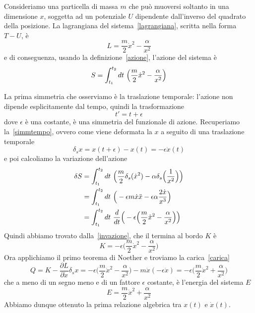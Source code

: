     \begin{example}
        Consideriamo una particella di massa $m$ che può muoversi soltanto in una dimensione $x$, soggetta ad un potenziale $U$ dipendente dall'inverso del quadrato della posizione. La lagrangiana del sistema~\eqref{lagrangiana}, scritta nella forma $T - U$, è
    \begin{equation} \label{lag1}
        L = \frac{m}{2} \dot x^2 - \frac{\alpha}{x^2} 
    \end{equation}
        e di conseguenza, usando la definizione~\eqref{azione}, l'azione del sistema è
    \begin{equation}
        S = \int_{t_1}^{t_2}dt~ \Big( \frac{m}{2} \dot x^2 - \frac{\alpha}{x^2} \Big)
    \end{equation}

        La prima simmetria che osserviamo è la traslazione temporale: l'azione non dipende esplicitamente dal tempo, quindi la trasformazione
    \begin{equation*}
        t' = t + \epsilon
    \end{equation*}
        dove $\epsilon$ è una costante, è una simmetria del funzionale di azione. Recuperiamo la~\eqref{simmtempo}, ovvero come viene deformata la $x$ a seguito di una traslazione temporale
    \begin{equation*}
        \delta_s x = x(t + \epsilon) - x(t) = - \epsilon \dot x(t)
    \end{equation*}
        e poi calcoliamo la variazione dell'azione
    \begin{equation*}
    \begin{aligned}
        \delta S & = \int_{t_1}^{t_2}dt~ \Big( \frac{m}{2} \delta_s (\dot x^2) - \alpha \delta_s \Big (\frac{1}{x^2} \Big) \Big) \\ & = \int_{t_1}^{t_2}dt~ \Big( - \epsilon m \dot x \ddot x - \epsilon \alpha \frac{2 \dot x}{x^3} \Big) \\ & = \int_{t_1}^{t_2}dt~ \frac{d}{dt} \Big( -\epsilon \Big( \frac{m}{2} \dot x^2 - \frac{\alpha}{x^2} \Big) \Big)
    \end{aligned}
    \end{equation*}
        Quindi abbiamo trovato dalla~\eqref{invazione}, che il termina al bordo $K$ è
    \begin{equation*}
        K = - \epsilon \Big (\frac{m}{2} \dot x^2 - \frac{\alpha}{x^2} \Big)
    \end{equation*}
        Ora applichiamo il primo teorema di Noether e troviamo la carica~\eqref{carica} 
    \begin{equation*}
        Q = K - \frac{\partial L}{\partial \dot x} \delta_s x = - \epsilon \Big (\frac{m}{2} \dot x^2 - \frac{\alpha}{x^2} \Big) - m \dot x (-\epsilon \dot x) = - \epsilon (\frac{m}{2} \dot x^2 + \frac{\alpha}{x^2} \Big)
    \end{equation*}
        che a meno di un segno meno e di un fattore $\epsilon$ costante, è l'energia del sistema $E$
    \begin{equation}\label{energia1}
        E = \frac{m}{2} \dot x^2 + \frac{\alpha}{x^2}
    \end{equation}
        Abbiamo dunque ottenuto la prima relazione algebrica tra $x(t)$ e $\dot x(t)$. 


\end{example}
